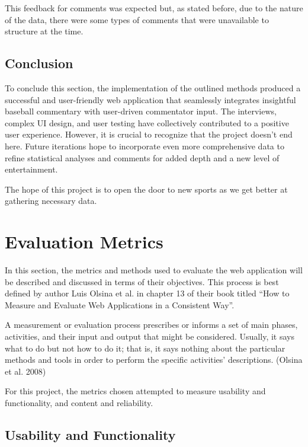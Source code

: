 \documentclass[10pt,twocolumn]{article}
\begin{document}
This feedback for comments was expected but, as stated before, due to the nature of the data, there were some types of comments that were unavailable to structure at the time.

\subsection{Conclusion}

To conclude this section, the implementation of the outlined methods produced a successful and user-friendly web application that seamlessly integrates insightful baseball commentary with user-driven commentator input. The interviews, complex UI design, and user testing have collectively contributed to a positive user experience. However, it is crucial to recognize that the project doesn't end here. Future iterations hope to incorporate even more comprehensive data to refine statistical analyses and comments for added depth and a new level of entertainment. 

The hope of this project is to open the door to new sports as we get better at gathering necessary data. 

\section{Evaluation Metrics}

In this section, the metrics and methods used to evaluate the web application will be described and discussed in terms of their objectives. This process is best defined by author Luis Olsina et al. in chapter 13 of their book titled “How to Measure and Evaluate Web Applications in a Consistent Way”.

\begin{displayquote}
    A measurement or evaluation process prescribes or informs a set of main phases, activities, and their input and output that might be considered. Usually, it says what to do but not how to do it; that is, it says nothing about the particular methods and tools in order to perform the specific activities’ descriptions. 
(Olsina et al. 2008)
\end{displayquote}
\cite{olsina2008}
For this project, the metrics chosen attempted to measure usability and functionality, and content and reliability.

\subsection{Usability and Functionality} 
\end{document}
